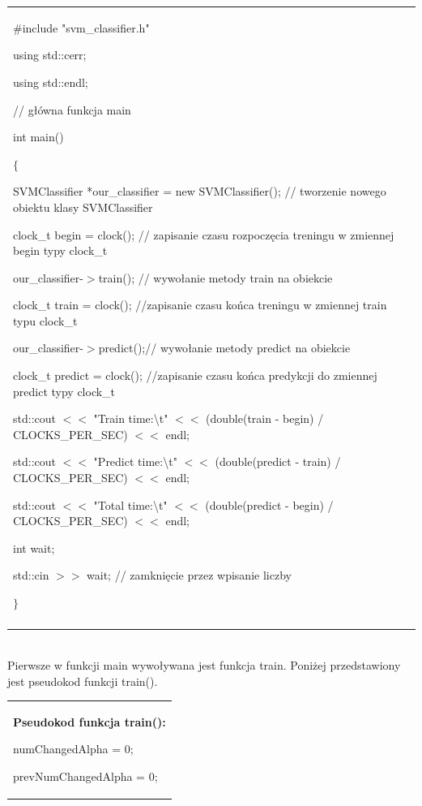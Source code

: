 \documentclass[11pt]{article}
\begin{document}
\begin{enumerate}
\begin{tabular}{|p{11.5cm}|}
\noindent \#include "svm\_classifier.h"

\noindent 

\noindent using std::cerr;

\noindent using std::endl;

\noindent // g{\l}\'{o}wna funkcja main

\noindent int main()

\noindent $\{$

 SVMClassifier *our\_classifier = new SVMClassifier();  // tworzenie nowego obiektu klasy SVMClassifier 

\noindent 

 clock\_t begin = clock();  // zapisanie czasu rozpocz\k{e}cia treningu w zmiennej begin typy clock\_t

 our\_classifier-$>$train(); // wywo{\l}anie metody train na obiekcie

 clock\_t train = clock(); //zapisanie czasu ko\'{n}ca treningu w zmiennej train typu clock\_t

 our\_classifier-$>$predict();// wywo{\l}anie metody predict na obiekcie

 clock\_t predict = clock(); //zapisanie czasu ko\'{n}ca predykcji do zmiennej predict typy clock\_t

 std::cout $<$$<$ "Train time:{\textbackslash}t" $<$$<$ (double(train - begin) / CLOCKS\_PER\_SEC) $<$$<$ endl;

 std::cout $<$$<$ "Predict time:{\textbackslash}t" $<$$<$ (double(predict - train) / CLOCKS\_PER\_SEC) $<$$<$ endl;

 std::cout $<$$<$ "Total time:{\textbackslash}t" $<$$<$ (double(predict - begin) / CLOCKS\_PER\_SEC) $<$$<$ endl;

 int wait;

 std::cin $>$$>$ wait; // zamkni\k{e}cie przez wpisanie liczby

\noindent 

\noindent $\}$
\\\\ \hline
\end{tabular}
\\
Pierwsze w funkcji main wywoływana jest funkcja train. Poniżej przedstawiony jest pseudokod funkcji train().\\
\begin{tabular}{|p{11.5cm}|} \hline
\noindent \textbf{Pseudokod funkcja train():}

 numChangedAlpha = 0;

 prevNumChangedAlpha = 0;


\end{tabular}
\end{enumerate}
\end{document}
